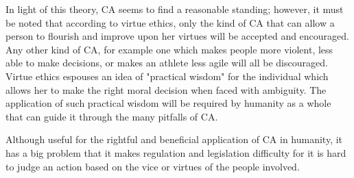 In light of this theory, CA seems to find a reasonable standing; however, it must be noted that according to virtue ethics, only the kind of CA that can allow a person to flourish and improve upon her virtues will be accepted and encouraged. Any other kind of CA, for example one which makes people more violent, less able to make decisions, or makes an athlete less agile will all be discouraged. Virtue ethics espouses an idea of "practical wisdom" for the individual which allows her to make the right moral decision when faced with ambiguity. The application of such practical wisdom will be required by humanity as a whole that can guide it through the many pitfalls of CA.

Although useful for the rightful and beneficial application of CA in humanity, it has a big problem that it makes regulation and legislation difficulty for it is hard to judge an action based on the vice or virtues of the people involved.